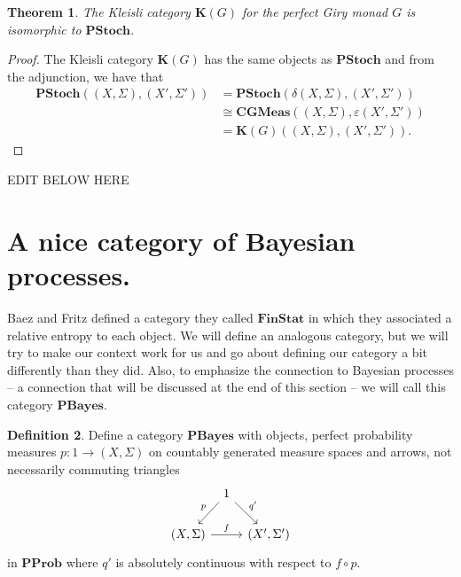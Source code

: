 \documentclass[11pt]{amsart}
\renewcommand{\epsilon}{\varepsilon}
\newcommand{\cat}[1]{\mathbf{#1}}
\newcommand{\from}{\colon}
\newtheorem{thm}{Theorem}[section]
\theoremstyle{remark}
\theoremstyle{definition}
\newtheorem{defn}[thm]{Definition}
\begin{document}
\begin{thm}
	The Kleisli category $\cat{K}(G)$ for the perfect Giry monad $G$ is isomorphic to $\cat{PStoch}$.
\end{thm}
\begin{proof}
	The Kleisli category $\cat{K}(G)$ has the 
	same objects as $\cat{PStoch}$ 
	and from the adjunction, we have that 
	\begin{align*}
		\cat{PStoch}((X,\Sigma),(X',\Sigma')) 
			& = 
			\cat{PStoch}(\delta(X,\Sigma),(X',\Sigma'))
			 \\
			& \cong 
			\cat{CGMeas}((X,\Sigma),\epsilon(X',\Sigma'))
			 \\
			& = 
			\cat{K}(G)((X,\Sigma),(X',\Sigma')).
	\end{align*}		
\end{proof}


{\color{red} EDIT BELOW HERE}
%
\section{A nice category of Bayesian 
processes.} \label{sec.bayes processes}
%

Baez and Fritz \cite{BaezFritz_RelEntropy} 
defined a category they called $\cat{FinStat}$ 
in which they associated a relative entropy to 
each object. We will define an analogous 
category, but we will 
try to make our context work for us and go 
about defining our category a bit differently 
than they did. Also, to emphasize the 
connection to Bayesian processes -- a 
connection that will be discussed at the end 
of this section -- we will call 
this category $\cat{PBayes}$. 

\begin{defn} \label{def.PBayes}
	Define a category $\cat{PBayes}$ with 
	objects, 
	perfect probability measures $p \from 1 
	\to (X,\Sigma)$ on countably 
	generated measure spaces and arrows, not 
	necessarily commuting triangles
	\[
	\begin{tikzcd}[column sep=tiny]
	{} & {1} \ar[dl,swap,"p"] \ar[dr,"q'"] & 
	{} \\
	{(X,\Sigma)} \ar[rr,"f"] & {} & 
	{(X',\Sigma')} 
	\end{tikzcd}
	\]
	in $\cat{PProb}$ where $q'$ is absolutely 
	continuous with respect to $f 
	\circ p$. 
\end{defn} 
\end{document}
